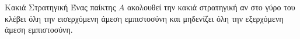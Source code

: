 {}
\begin{definitiongr}{Κακιά Στρατηγική}
  Ένας παίκτης $A$ ακολουθεί την κακιά στρατηγική αν στο γύρο του κλέβει όλη την εισερχόμενη άμεση εμπιστοσύνη και μηδενίζει
  όλη την εξερχόμενη άμεση εμπιστοσύνη.
\end{definitiongr}
